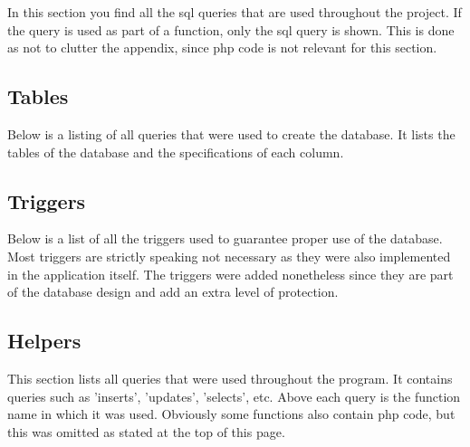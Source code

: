 In this section you find all the sql queries that are used throughout the project.
If the query is used as part of a function, only the sql query is shown. This is done as not to
clutter the appendix, since php code is not relevant for this section. 

\subsection{Tables}
Below is a listing of all queries that were used to create the database. It lists
the tables of the database and the specifications of each column.


\subsection{Triggers}
Below is a list of all the triggers used to guarantee proper use of the database.
Most triggers are strictly speaking not necessary as they were also implemented in the
application itself. The triggers were added nonetheless since they are part of the database
design and add an extra level of protection.


\subsection{Helpers}
This section lists all queries that were used throughout the program. It contains queries such
as 'inserts', 'updates', 'selects', etc. Above each query is the function name in which it was
used. Obviously some functions also contain php code, but this was omitted as stated at the top of
this page.


